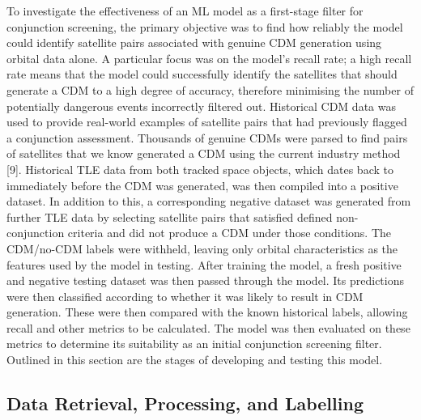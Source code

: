 To investigate the effectiveness of an ML model as a first-stage filter for conjunction screening, the primary objective was to find how reliably the model could identify satellite pairs associated with genuine CDM generation using orbital data alone. A particular focus was on the model’s recall rate; a high recall rate means that the model could successfully identify the satellites that should generate a CDM to a high degree of accuracy, therefore minimising the number of potentially dangerous events incorrectly filtered out. 
Historical CDM data was used to provide real-world examples of satellite pairs that had previously flagged a conjunction assessment. Thousands of genuine CDMs were parsed to find pairs of satellites that we know generated a CDM using the current industry method [9]. Historical TLE data from both tracked space objects, which dates back to immediately before the CDM was generated, was then compiled into a positive dataset. In addition to this, a corresponding negative dataset was generated from further TLE data by selecting satellite pairs that satisfied defined non-conjunction criteria and did not produce a CDM under those conditions.
The CDM/no-CDM labels were withheld, leaving only orbital characteristics as the features used by the model in testing. After training the model, a fresh positive and negative testing dataset was then passed through the model. Its predictions were then classified according to whether it was likely to result in CDM generation. These were then compared with the known historical labels, allowing recall and other metrics to be calculated. The model was then evaluated on these metrics to determine its suitability as an initial conjunction screening filter. Outlined in this section are the stages of developing and testing this model.

\subsection{Data Retrieval, Processing, and Labelling}

